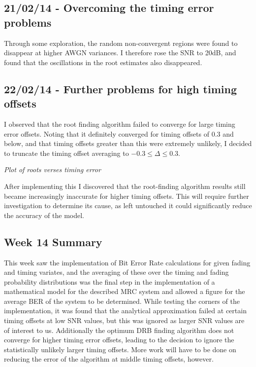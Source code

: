 \subsection{21/02/14 - Overcoming the timing error problems}

Through some exploration, the random non-convergent regions were found
to disappear at higher AWGN variances. I therefore rose the SNR to 20dB,
and found that the oscillations in the root estimates also disappeared.

\subsection{22/02/14 - Further problems for high timing offsets}

I observed that the root finding algorithm failed to converge for large
timing error offsets. Noting that it definitely converged for timing
offsets of 0.3 and below, and that timing offsets greater than this were
extremely unlikely, I decided to truncate the timing offset averaging to
$-0.3 \le \Delta \le 0.3$.

\emph{Plot of roots verses timing error}

After implementing this I discovered that the root-finding algorithm
results still became increasingly inaccurate for higher timing offsets.
This will require further investigation to determine its cause, as left
untouched it could significantly reduce the accuracy of the model.

\subsection{Week 14 Summary}

This week saw the implementation of Bit Error Rate calculations for
given fading and timing variates, and the averaging of these over the
timing and fading probability distributions was the final step in the
implementation of a mathematical model for the described MRC system and
allowed a figure for the average BER of the system to be determined.
While testing the corners of the implementation, it was found that the
analytical approximation failed at certain timing offsets at low SNR
values, but this was ignored as larger SNR values are of interest to us.
Additionally the optimum DRB finding algorithm does not converge for
higher timing error offsets, leading to the decision to ignore the
statistically unlikely larger timing offsets. More work will have to be
done on reducing the error of the algorithm at middle timing offsets,
however.

